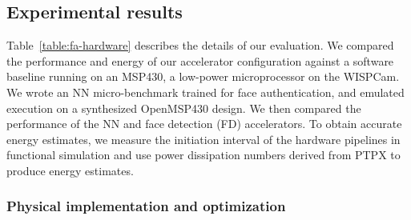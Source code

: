 \subsection{Experimental results}
Table~\ref{table:fa-hardware} describes the details of our evaluation. We compared the performance and energy of our accelerator configuration against a software baseline running on an MSP430, a low-power microprocessor on the WISPCam. We wrote an NN micro-benchmark trained for face authentication, and emulated execution on a synthesized OpenMSP430 design. We then compared the performance of the NN and face detection (FD) accelerators. To obtain accurate energy estimates, we measure the initiation interval of the hardware pipelines in functional simulation
and use power dissipation numbers derived from PTPX to produce energy estimates.


\begin{table}[h]
  \caption{Face authentication system parameters.}
  \label{table:fa-hardware}

\end{table}

\subsubsection{Physical implementation and optimization}

